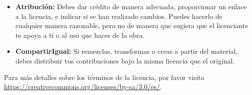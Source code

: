 \documentclass[12pt,a4paper]{article}
\begin{document}
\newpage
{} %

\vspace*{\fill} %
\doclicenseThis                                                          %
\bigskip                                                                 %
\begin{itemize}                                                          %
    \item {\textbf{Atribución:} {Debes dar crédito de manera adecuada,   %
    proporcionar un enlace a la licencia, e indicar si se han            %
    realizado cambios. Puedes hacerlo de cualquier manera razonable,     %
    pero no de manera que sugiera que el licenciante te apoya a ti       %
    o al uso que haces de la obra.}}                                     %
    \item {\textbf{CompartirIgual:} {Si remezclas, transformas o         %
    creas a partir del material, debes distribuir tus contribuciones     %
    bajo la misma licencia que el original.}}                            %
\end{itemize}                                                            %
Para más detalles sobre los términos de la licencia, por favor visita    %
\url{https://creativecommons.org/licenses/by-sa/3.0/es/}.                %
    \vspace{1cm} %
\end{document}
